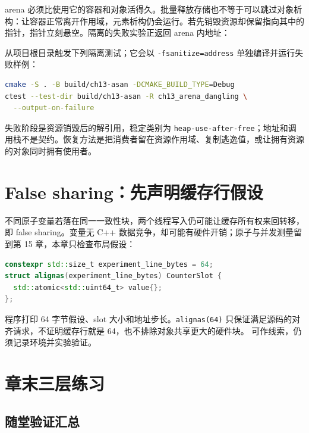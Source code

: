 arena 必须比使用它的容器和对象活得久。批量释放存储也不等于可以跳过对象析构：让容器正常离开作用域，元素析构仍会运行。若先销毁资源却保留指向其中的指针，指针立刻悬空。隔离的失败实验正返回 arena 内地址：



从项目根目录触发下列隔离测试；它会以 \texttt{-fsanitize=address} 单独编译并运行失败样例：

\begin{lstlisting}[language=bash,numbers=none]
cmake -S . -B build/ch13-asan -DCMAKE_BUILD_TYPE=Debug
ctest --test-dir build/ch13-asan -R ch13_arena_dangling \
  --output-on-failure
\end{lstlisting}

失败阶段是资源销毁后的解引用，稳定类别为 \texttt{heap-use-after-free}；地址和调用栈不是契约。恢复方法是把消费者留在资源作用域、复制逃逸值，或让拥有资源的对象同时拥有使用者。

\section{False sharing：先声明缓存行假设}

不同原子变量若落在同一一致性块，两个线程写入仍可能让缓存所有权来回转移，即 false sharing。变量无 C++ 数据竞争，却可能有硬件开销；原子与并发测量留到第 15 章，本章只检查布局假设：

\begin{lstlisting}[language=C++,numbers=none]
constexpr std::size_t experiment_line_bytes = 64;
struct alignas(experiment_line_bytes) CounterSlot {
  std::atomic<std::uint64_t> value{};
};
\end{lstlisting}

程序打印 64 字节假设、slot 大小和地址步长。\texttt{alignas(64)} 只保证满足源码的对齐请求，不证明缓存行就是 64，也不排除对象共享更大的硬件块。 可作线索，仍须记录环境并实验验证。

\enlargethispage{2\baselineskip}
\section{章末三层练习}

\subsection*{随堂验证汇总}

